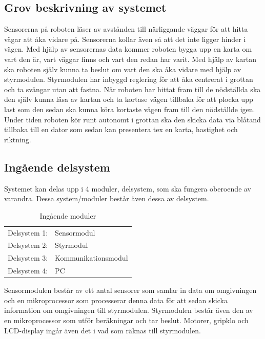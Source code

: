 \documentclass[11pt]{article}
\begin{document}
\begin{flushleft}
\subsection{Grov beskrivning av systemet}
Sensorerna på roboten läser av avstånden till närliggande väggar för att hitta vägar att åka vidare på. Sensorerna kollar även så att det inte ligger hinder i vägen. Med hjälp av sensorernas data kommer roboten bygga upp en karta om vart den är, vart väggar finns och vart den redan har varit. Med hjälp av kartan ska roboten själv kunna ta beslut om vart den ska åka vidare med hjälp av styrmodulen.
Styrmodulen har inbyggd reglering för att åka centrerat i grottan och ta svängar utan att fastna. När roboten har hittat fram till de nödställda ska den själv kunna läsa av kartan och ta kortase vägen tillbaka för att plocka upp last som den sedan ska kunna köra kortaste vägen fram till den nödställde igen. Under tiden roboten kör runt autonomt i grottan ska den skicka data via blåtand tillbaka till en dator som sedan kan presentera tex en karta, hastighet och riktning.    
 
\subsection{Ingående delsystem}
Systemet kan delas upp i 4 moduler, delsystem, som ska fungera oberoende av varandra. Dessa system/moduler består även dessa av delsystem.


\begin{table}[ht]

\centering
\begin{tabular}{c l}
Delsystem 1:&
Sensormodul \\

Delsystem 2:&
Styrmodul \\

Delsystem 3:&
Kommunikationsmodul \\

Delsystem 4:&
PC \\
\end{tabular}
\caption{Ingående moduler}
\label{tab:Moduler}
\end{table}



\bigskip

Sensormodulen består av ett antal sensorer som samlar in data om omgivningen och en mikroprocessor som processerar denna data för att sedan skicka information om omgivningen till styrmodulen. Styrmodulen består även den av en mikroprocessor som utför beräkningar och tar beslut. Motorer, gripklo och LCD-display ingår även det i vad som räknas till styrmodulen.


\end{flushleft}
\end{document}
